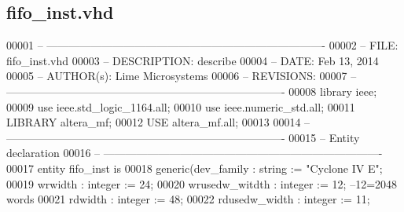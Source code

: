 \subsection{fifo\+\_\+inst.\+vhd}
\label{rx__modules_2fifo__inst_8vhd_source}

\begin{DoxyCode}
00001 \textcolor{keyword}{-- ---------------------------------------------------------------------------- }
00002 \textcolor{keyword}{-- FILE:    fifo\_inst.vhd}
00003 \textcolor{keyword}{-- DESCRIPTION: describe}
00004 \textcolor{keyword}{-- DATE:    Feb 13, 2014}
00005 \textcolor{keyword}{-- AUTHOR(s):   Lime Microsystems}
00006 \textcolor{keyword}{-- REVISIONS:}
00007 \textcolor{keyword}{-- ---------------------------------------------------------------------------- }
00008 \textcolor{vhdlkeyword}{library }\textcolor{keywordflow}{ieee};
00009 \textcolor{vhdlkeyword}{use }ieee.std\_logic\_1164.\textcolor{keywordflow}{all};
00010 \textcolor{vhdlkeyword}{use }ieee.numeric\_std.\textcolor{keywordflow}{all};
00011 \textcolor{vhdlkeyword}{LIBRARY }\textcolor{keywordflow}{altera\_mf};
00012 \textcolor{vhdlkeyword}{USE }\textcolor{keywordflow}{altera\_mf.all};
00013 
00014 \textcolor{keyword}{-- ----------------------------------------------------------------------------}
00015 \textcolor{keyword}{-- Entity declaration}
00016 \textcolor{keyword}{-- ----------------------------------------------------------------------------}
00017 \textcolor{keywordflow}{entity }fifo_inst \textcolor{keywordflow}{is}
00018   \textcolor{keywordflow}{generic}\textcolor{vhdlchar}{(}\textcolor{vhdlchar}{dev_family}         \textcolor{vhdlchar}{:} \textcolor{comment}{string}  \textcolor{vhdlchar}{:=} \textcolor{keyword}{"Cyclone IV E"};
00019           \textcolor{vhdlchar}{wrwidth}         \textcolor{vhdlchar}{:} \textcolor{comment}{integer} \textcolor{vhdlchar}{:=} \textcolor{vhdllogic}{}\textcolor{vhdllogic}{24};
00020           \textcolor{vhdlchar}{wrusedw_witdth}  \textcolor{vhdlchar}{:} \textcolor{comment}{integer} \textcolor{vhdlchar}{:=} \textcolor{vhdllogic}{}\textcolor{vhdllogic}{12};\textcolor{keyword}{ --12=2048 words }
00021           \textcolor{vhdlchar}{rdwidth}         \textcolor{vhdlchar}{:} \textcolor{comment}{integer} \textcolor{vhdlchar}{:=} \textcolor{vhdllogic}{}\textcolor{vhdllogic}{48};
00022           \textcolor{vhdlchar}{rdusedw_width}   \textcolor{vhdlchar}{:} \textcolor{comment}{integer} \textcolor{vhdlchar}{:=} \textcolor{vhdllogic}{}\textcolor{vhdllogic}{11};

\end{DoxyCode}
